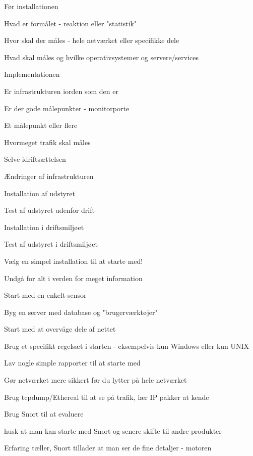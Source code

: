 \documentclass[Screen16to9,17pt]{foils}
\begin{document}
\begin{list1}
\item Før installationen
\begin{list2}
\item Hvad er formålet - reaktion eller "statistik"
\item Hvor skal der måles - hele netværket eller specifikke dele
\item Hvad skal måles og hvilke operativsystemer og servere/services
\end{list2}
\item Implementationen
\begin{list2}
\item Er infrastrukturen iorden som den er
\item Er der gode målepunkter - monitorporte
\item Et målepunkt eller flere
\item Hvormeget trafik skal måles
\end{list2}
\item Selve idriftsættelsen
\begin{list2}
\item Ændringer af infrastrukturen
\item Installation af udstyret
\item Test af udstyret udenfor drift
\item Installation i driftsmiljøet
\item Test af udstyret i driftsmiljøet
\end{list2}
\end{list1}


\begin{list1}
\item Vælg en simpel installation til at starte med!
\item Undgå for alt i verden for meget information
\begin{list2}
\item Start med en enkelt sensor
\item Byg en server med database og "brugerværktøjer"
\item Start med at overvåge dele af nettet
\item Brug et specifikt regelsæt i starten - eksempelvis kun Windows eller kun UNIX
\item Lav nogle simple rapporter til at starte med
\end{list2}
\item Gør netværket mere sikkert før du lytter på hele netværket
\item Brug tcpdump/Ethereal til at se på trafik, lær IP pakker at
  kende
\item Brug Snort til at evaluere
\begin{list2}
\item husk at man kan starte med Snort og senere skifte til andre
produkter
\item Erfaring tæller, Snort tillader at man ser de fine detaljer - motoren
\end{list2}
\end{list1}
\end{document}
